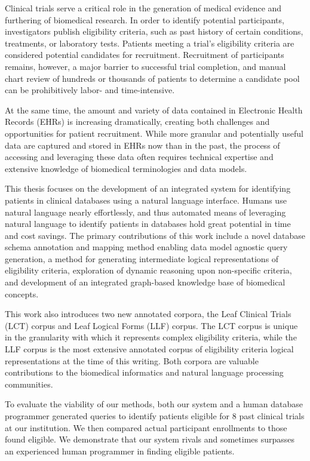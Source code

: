 \documentclass[../main.tex]{subfiles}
\begin{document}
Clinical trials serve a critical role in the generation of medical evidence and furthering of biomedical research. In order to identify potential participants, investigators publish eligibility criteria, such as past history of certain conditions, treatments, or laboratory tests. Patients meeting a trial's eligibility criteria are considered potential candidates for recruitment. Recruitment of participants remains, however, a major barrier to successful trial completion, and manual chart review of hundreds or thousands of patients to determine a candidate pool can be prohibitively labor- and time-intensive. 

At the same time, the amount and variety of data contained in Electronic Health Records (EHRs) is increasing dramatically, creating both challenges and opportunities for patient recruitment. While more granular and potentially useful data are captured and stored in EHRs now than in the past, the process of accessing and leveraging these data often requires technical expertise and extensive knowledge of biomedical terminologies and data models.

This thesis focuses on the development of an integrated system for identifying patients in clinical databases using a natural language interface. Humans use natural language nearly effortlessly, and thus automated means of leveraging natural language to identify patients in databases hold great potential in time and cost savings. The primary contributions of this work include a novel database schema annotation and mapping method enabling data model agnostic query generation, a method for generating intermediate logical representations of eligibility criteria, exploration of dynamic reasoning upon non-specific criteria, and development of an integrated graph-based knowledge base of biomedical concepts.

This work also introduces two new annotated corpora, the Leaf Clinical Trials (LCT) corpus and Leaf Logical Forms (LLF) corpus. The LCT corpus is unique in the granularity with which it represents complex eligibility criteria, while the LLF corpus is the most extensive annotated corpus of eligibility criteria logical representations at the time of this writing. Both corpora are valuable contributions to the biomedical informatics and natural language processing communities.

To evaluate the viability of our methods, both our system and a human database programmer generated queries to identify patients eligible for 8 past clinical trials at our institution. We then compared actual participant enrollments to those found eligible. We demonstrate that our system rivals and sometimes surpasses an experienced human programmer in finding eligible patients.
\end{document}
